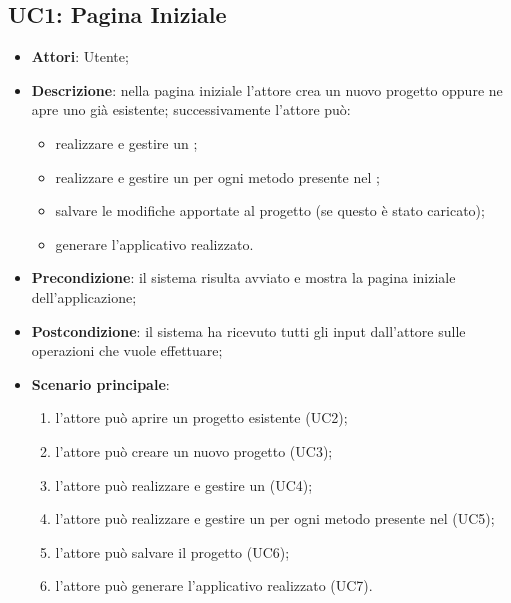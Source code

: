 \subsection{UC1: Pagina Iniziale}
\label{UC1}
\begin{itemize}
	\item \textbf{Attori}: Utente;
	\item \textbf{Descrizione}: nella pagina iniziale l'attore crea un nuovo progetto oppure ne apre uno già esistente; successivamente l'attore può:
	\begin{itemize}
		\item realizzare e gestire un ;
		\item realizzare e gestire un  per ogni metodo presente nel ;
		\item salvare le modifiche apportate al progetto (se questo è stato caricato);
		\item generare l'applicativo realizzato.
	\end{itemize}
	\item \textbf{Precondizione}: il sistema risulta avviato e mostra la pagina iniziale dell'applicazione;
	\item \textbf{Postcondizione}: il sistema ha ricevuto tutti gli input dall'attore sulle operazioni che vuole effettuare;
	\item \textbf{Scenario principale}:
	\begin{enumerate}
		\item l'attore può aprire un progetto esistente (UC2);
		\item l'attore può creare un nuovo progetto (UC3);
		\item l'attore può realizzare e gestire un  (UC4);
		\item l'attore può realizzare e gestire un  per ogni metodo presente nel  (UC5);
		\item l'attore può salvare il progetto (UC6);
		\item l'attore può generare l'applicativo realizzato (UC7).
	\end{enumerate}
\end{itemize}

